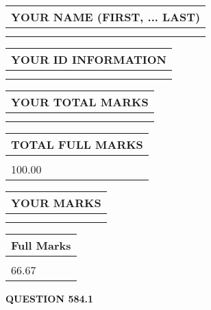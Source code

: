 \documentclass{ctexart}
\begin{document}
   
   
   
\newpage 
\setcounter{page}{ 
   584001 } 
   
   
   
   
\noindent\begin{tabular}{|l|}
\hline
YOUR NAME (FIRST, ... LAST)  \\
\hline
 \\ 
 \\ 
\hline
\end{tabular}
\hspace{0.05in} \begin{tabular}{|l|}
\hline
 YOUR   ID   INFORMATION  \\
\hline
 \\ 
 \\ 
\hline
\end{tabular}
   
   
\vspace{0.2in}\noindent\begin{tabular}{|l|}
\hline
YOUR TOTAL MARKS  \\
\hline
 \\ 
 \\ 
\hline
\end{tabular}
\hspace{0.05in} \begin{tabular}{|l|}
\hline
TOTAL FULL MARKS  \\
\hline
 \\ 
100.00 \\
\hline
\end{tabular}
   
   
 \vspace{0.2in}
 
 
 
 
   
   
  
\vspace{0.2in}
  
\noindent\begin{tabular}{|l|}
\hline
 YOUR MARKS  \\
\hline
 \\ 
 \\ 
\hline
\end{tabular}
\hspace{0.05in} \begin{tabular}{|l|}
\hline
 Full Marks  \\
\hline
 \\ 
66.67 \\
\hline
\end{tabular}
{\textbf{\Large{QUESTION
584.1 
}}}
  
\end{document}
